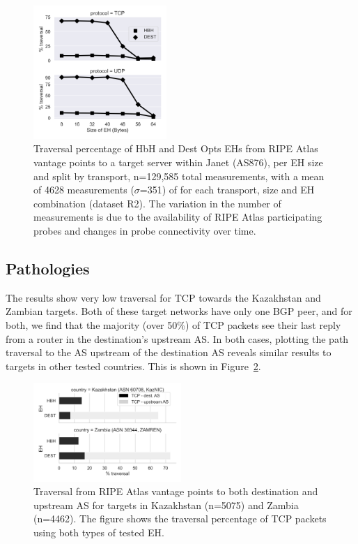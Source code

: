 \documentclass[conference]{IEEEtran}
\begin{document}
\begin{figure}
\centering
  \includegraphics[width=0.45\textwidth]{sizes.png}
  \caption{Traversal percentage of HbH and Dest Opts EHs from RIPE Atlas vantage points to a target server within Janet (AS876), per EH size and split by transport, n=129,585 total measurements, with a mean of 4628 measurements ($\sigma$=351) of for each transport, size and EH combination (dataset R2). The variation in the number of measurements is due to the availability of RIPE Atlas participating probes and changes in probe connectivity over time.}
  \label{fig:sizes}
\end{figure}

\subsection{Pathologies}
    \label{subsec: pathologies}

The results show very low traversal for TCP towards the Kazakhstan and Zambian targets. Both of these target networks have only one BGP peer, and for both, we find that the majority (over 50\%) of TCP packets see their last reply from a router in the destination's upstream AS. In both cases, plotting the path traversal to the AS upstream of the destination AS reveals similar results to targets in other tested countries. This is shown in Figure~\ref{fig:traversal_pathologies}.

\begin{figure}
\centering
  \includegraphics[width=0.5\textwidth]{traversal-pathologies.png}
  \caption{Traversal from RIPE Atlas vantage points to both destination and upstream AS for targets in Kazakhstan (n=5075) and Zambia (n=4462). The figure shows the traversal percentage of TCP packets using both types of tested EH.}
  \label{fig:traversal_pathologies}
\end{figure}
\end{document}

